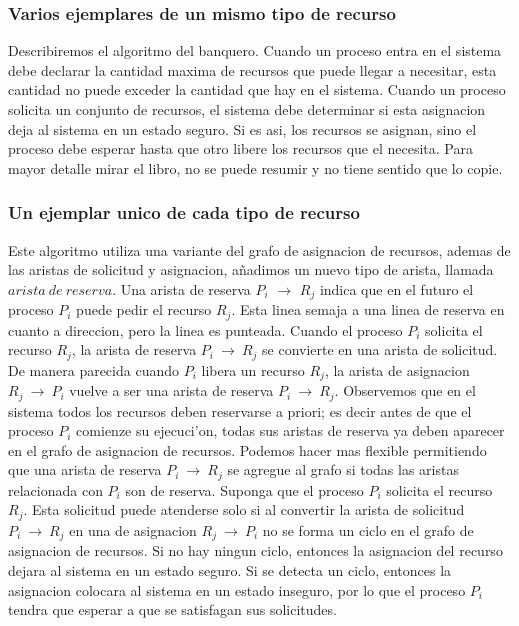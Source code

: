 \documentclass[a4paper,10pt]{article}
\begin{document}
\subsubsection{Varios ejemplares de un mismo tipo de recurso}
Describiremos el algoritmo del banquero.
Cuando un proceso entra en el sistema debe declarar la cantidad maxima de recursos que puede llegar a necesitar, esta cantidad no puede exceder la cantidad que hay en el sistema. Cuando un proceso solicita un conjunto de recursos, el sistema debe determinar si esta asignacion deja al sistema en un estado seguro. Si es asi, los recursos se asignan, sino el proceso debe esperar hasta que otro libere los recursos que el necesita. Para mayor detalle mirar el libro, no se puede resumir y no tiene sentido que lo copie.

\subsubsection{Un ejemplar unico de cada tipo de recurso}
Este algoritmo utiliza una variante del grafo de asignacion de recursos, ademas de las aristas de solicitud y asignacion, añadimos un nuevo tipo de arista, llamada $arista\ de\ reserva$. Una arista de reserva $P_{i}$ $\rightarrow$ $R_{j}$ indica que en el futuro el proceso $P_{i}$ puede pedir el recurso $R_{j}$. Esta linea semaja a una linea de reserva en cuanto a direccion, pero la linea es punteada. Cuando el proceso $P_{i}$ solicita el recurso $R_{j}$, la arista de reserva $P_{i}\ \rightarrow\ R_{j}$ se convierte en una arista de solicitud. De manera parecida cuando $P_{i}$ libera un recurso $R_{j}$, la arista de asignacion $R_{j}\ \rightarrow\ P_{i}$ vuelve a ser una arista de reserva $P_{i}\ \rightarrow\ R_{j}$. Observemos que en el sistema todos los recursos deben reservarse a priori; es decir antes de que el proceso $P_{i}$ comienze su ejecuci'on, todas sus aristas de reserva ya deben aparecer en el grafo de asignacion de recursos. Podemos hacer mas flexible permitiendo que una arista de reserva $P_{i}\ \rightarrow\ R_{j}$ se agregue al grafo si todas las aristas relacionada con $P_{i}$ son de reserva.
Suponga que el proceso $P_{i}$ solicita el recurso $R_{j}$. Esta solicitud puede atenderse solo si al convertir la arista de solicitud $P_{i}\ \rightarrow\ R_{j}$ en una de asignacion $R_{j}\ \rightarrow\ P_{i}$ no se forma un ciclo en el grafo de asignacion de recursos.
Si no hay ningun ciclo, entonces la asignacion del recurso dejara al sistema en un estado seguro. Si se detecta un ciclo, entonces la asignacion colocara al sistema en un estado inseguro, por lo que el proceso $P_{i}$ tendra que esperar a que se satisfagan sus solicitudes.
\end{document}
